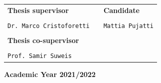 \documentclass[../main.tex]{subfiles}
\begin{document}
\begin{titlepage}
		\vspace{10mm}
		\begin{tabular}{lcl}
			{\Large{\bf Thesis supervisor}} & \hspace{5.5cm} & {\Large{\bf Candidate}}\\
			\\
			{\Large{\tt Dr. Marco Cristoforetti}} & & {\Large{\tt Mattia Pujatti}}\\
			\\
			{\Large{\bf Thesis co-supervisor}}\\
			\\
			{\Large{\tt Prof. Samir Suweis}}\\
		\end{tabular}

		\vspace{20mm}
		\begin{center}
			{\Large{\bf Academic Year 2021/2022}}
		\end{center}
	\end{titlepage}
	\clearpage{\pagestyle{empty}\cleardoublepage}
	
	
\end{document}
